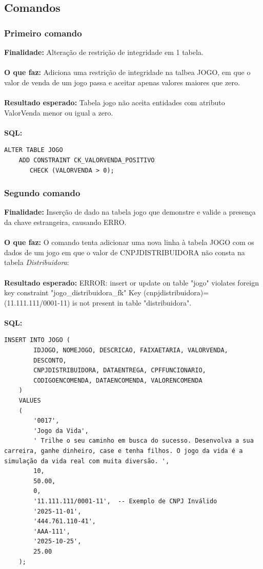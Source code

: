 \documentclass[11pt]{article}
\begin{document}
\subsection{Comandos}
\subsubsection{Primeiro comando}
\textbf{Finalidade:} Alteração de restrição de integridade em 1 tabela.\\\\
\textbf{O que faz:} Adiciona uma restrição de integridade na talbea JOGO, em que o valor de venda de um jogo passa e aceitar apenas valores maiores que zero.\\\\
\textbf{Resultado esperado:} Tabela jogo não aceita entidades com atributo ValorVenda menor ou igual a zero.\\\\
\textbf{SQL:}
    \begin{Verbatim}[breaklines=true, breakanywhere=true]
    ALTER TABLE JOGO
    ADD CONSTRAINT CK_VALORVENDA_POSITIVO 
       CHECK (VALORVENDA > 0);
    \end{Verbatim}

\subsubsection{Segundo comando}
\textbf{Finalidade:} Inserção de dado na tabela jogo que demonstre e valide a presença da chave estrangeira, causando ERRO.\\\\
\textbf{O que faz:} O comando tenta adicionar uma nova linha à tabela JOGO com os dados de um jogo em que o valor de CNPJDISTRIBUIDORA não consta na tabela \textit{Distribuidora}: \\\\
\textbf{Resultado esperado:} ERROR:  insert or update on table "jogo" violates foreign key constraint "jogo\_distribuidora\_fk" Key (cnpjdistribuidora)=(11.111.111/0001-11) is not present in table "distribuidora".\\\\
\textbf{SQL:}
    \begin{Verbatim}[breaklines=true, breakanywhere=true]
    INSERT INTO JOGO (
        IDJOGO, NOMEJOGO, DESCRICAO, FAIXAETARIA, VALORVENDA,
        DESCONTO,
        CNPJDISTRIBUIDORA, DATAENTREGA, CPFFUNCIONARIO,
        CODIGOENCOMENDA, DATAENCOMENDA, VALORENCOMENDA
    ) 
    VALUES
    (
        '0017', 
        'Jogo da Vida', 
        ' Trilhe o seu caminho em busca do sucesso. Desenvolva a sua carreira, ganhe dinheiro, case e tenha filhos. O jogo da vida é a simulação da vida real com muita diversão. ',
        10, 
        50.00, 
        0, 
        '11.111.111/0001-11',  -- Exemplo de CNPJ Inválido
        '2025-11-01',
        '444.761.110-41',
        'AAA-111',
        '2025-10-25', 
        25.00
    );
    \end{Verbatim}
\end{document}
